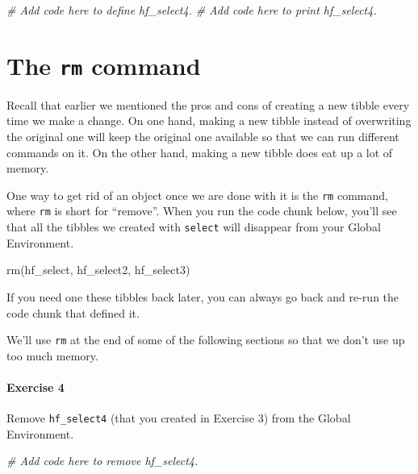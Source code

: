 \documentclass[
]{book}
\newenvironment{Shaded}{\begin{snugshade}}{\end{snugshade}}
\newcommand{\CommentTok}[1]{\textcolor[rgb]{0.56,0.35,0.01}{\textit{#1}}}
\newcommand{\FunctionTok}[1]{\textcolor[rgb]{0.00,0.00,0.00}{#1}}
\newcommand{\NormalTok}[1]{#1}
\begin{document}
\begin{Shaded}
\begin{Highlighting}[]
\CommentTok{\# Add code here to define hf\_select4.}
\CommentTok{\# Add code here to print hf\_select4.}
\end{Highlighting}
\end{Shaded}

\hypertarget{manipulating-rm}{%
\section{\texorpdfstring{The \texttt{rm} command}{The rm command}}\label{manipulating-rm}}

Recall that earlier we mentioned the pros and cons of creating a new tibble every time we make a change. On one hand, making a new tibble instead of overwriting the original one will keep the original one available so that we can run different commands on it. On the other hand, making a new tibble does eat up a lot of memory.

One way to get rid of an object once we are done with it is the \texttt{rm} command, where \texttt{rm} is short for ``remove''. When you run the code chunk below, you'll see that all the tibbles we created with \texttt{select} will disappear from your Global Environment.

\begin{Shaded}
\begin{Highlighting}[]
\FunctionTok{rm}\NormalTok{(hf\_select, hf\_select2, hf\_select3)}
\end{Highlighting}
\end{Shaded}

If you need one these tibbles back later, you can always go back and re-run the code chunk that defined it.

We'll use \texttt{rm} at the end of some of the following sections so that we don't use up too much memory.

\hypertarget{exercise-4-2}{%
\paragraph*{Exercise 4}\label{exercise-4-2}}

Remove \texttt{hf\_select4} (that you created in Exercise 3) from the Global Environment.

\begin{Shaded}
\begin{Highlighting}[]
\CommentTok{\# Add code here to remove hf\_select4.}
\end{Highlighting}
\end{Shaded}
\end{document}
